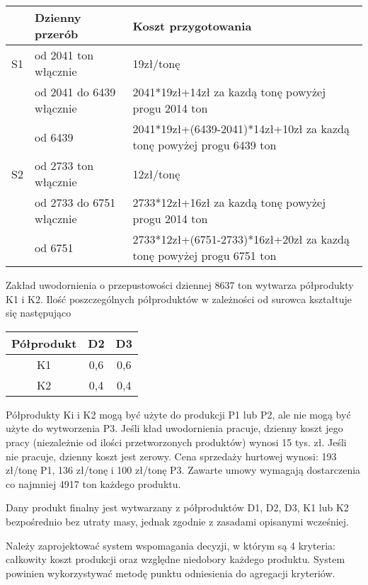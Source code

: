 \documentclass[a4paper, 10pt]{article}
\begin{document}
\begin{center}
    \begin{tabular}{ | l | l | l |}
    \hline
    & Dzienny przerób & Koszt przygotowania \\ \hline
	S1 & od 2041 ton włącznie & 19zł/tonę \\ \hline
	& od 2041 do 6439 włącznie & 2041*19zł+14zł za kazdą tonę powyżej progu 2014 ton \\ \hline
	& od 6439 & 2041*19zł+(6439-2041)*14zł+10zł za kazdą tonę powyżej progu 6439 ton \\ \hline
	S2 & od 2733 ton włącznie & 12zł/tonę \\ \hline
	& od 2733 do 6751 włącznie & 2733*12zł+16zł za kazdą tonę powyżej progu 2014 ton \\ \hline
	& od 6751 & 2733*12zł+(6751-2733)*16zł+20zł za kazdą tonę powyżej progu 6751 ton \\ \hline
    \end{tabular}
\end{center}



Zakład uwodornienia o przepustowości dziennej 8637 ton wytwarza półprodukty K1 i K2. Ilość poszczególnych półproduktów w zależności od surowca kształtuje się następująco



\begin{center}
    \begin{tabular}{ | c | c | c |}
    \hline
    Półprodukt & D2 & D3 \\ \hline
	K1 & 0,6 & 0,6 \\ \hline
	K2 & 0,4 & 0,4 \\ \hline
    \end{tabular}
\end{center}


Półprodukty Ki i K2 mogą być użyte do produkcji P1 lub P2, ale nie mogą być użyte do wytworzenia P3. Jeśli 
kład uwodornienia pracuje, dzienny koszt jego pracy (niezależnie od ilości przetworzonych produktów) wynosi
15 tys. zł. Jeśli nie pracuje, dzienny koszt jest zerowy. Cena sprzedaży hurtowej wynosi: 193 zł/tonę P1, 136 zł/tonę i
100 zł/tonę P3. Zawarte umowy wymagają dostarczenia co najmniej 4917 ton każdego produktu.

Dany produkt finalny jest wytwarzany z półproduktów D1, D2, D3, K1 lub K2 bezpośrednio bez utraty masy, jednak zgodnie
z zasadami opisanymi wcześniej.

Należy zaprojektować system wspomagania decyzji, w którym są 4 kryteria: całkowity koszt produkcji oraz względne niedobory
każdego produktu. System powinien wykorzystywać metodę punktu odniesienia do agregacji kryteriów.
\end{document}
